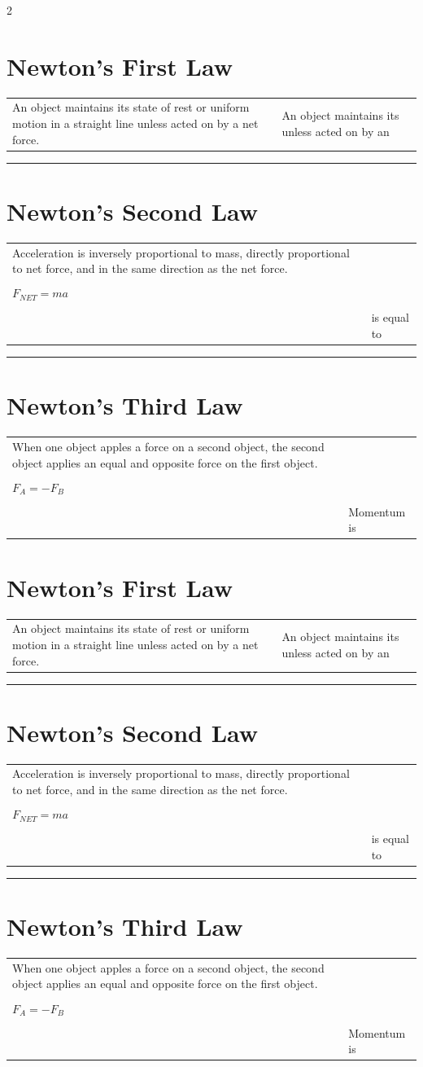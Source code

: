 \documentclass[12pt,landscape]{exam}
\begin{document}
\pagestyle{empty}

\newcommand{\mycontent}{
  \section*{Newton's First Law}
  \begin{tabular}{p{1.8in}|p{2.7in}}
    An object maintains its state of rest or uniform motion in a straight line unless acted on by a net force. &
    \vspace{1em}
    \raggedright
    An object maintains its \fillin[momentum][9em] unless acted on by an \fillin[outside impulse][11em]\\[1em]
  \end{tabular}
  \vspace{1em}
  \hrule

  \section*{Newton's Second Law}
  \begin{tabular}{p{1.8in}|p{2.7in}}
    Acceleration is inversely proportional to mass, directly proportional to net force, and in the same direction as the net force. & \\
    &\\[1em]
    \centering $F_{NET}=ma$ & \\
    &\\
    & \fillin[impulse][12em] is equal to \fillin[change in momentum][2.7in] \\[1em]
  \end{tabular}
  \vspace{1em}
  \hrule


  \section*{Newton's Third Law}
  \begin{tabular}{p{1.8in}|p{2.7in}}
    When one object apples a force on a second object, the second object applies an equal and opposite force on the first object. & \\
    &\\[1em]
    \centering $F_A=-F_B$ & \\
    &\\[3em]
    & Momentum is \fillin[conserved][10.4em]
  \end{tabular}
}

\begin{multicols}{2}

  \mycontent

  \columnbreak

  \mycontent

\end{multicols}
\end{document}
